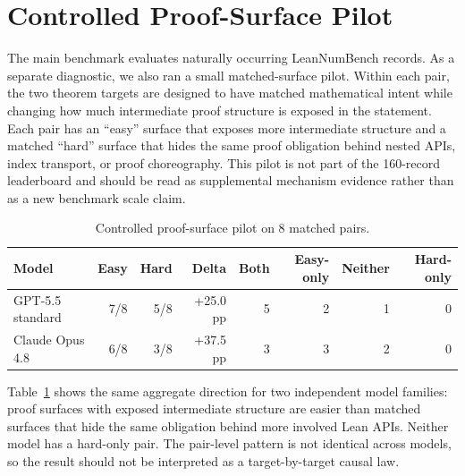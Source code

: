 \section{Controlled Proof-Surface Pilot}

The main benchmark evaluates naturally occurring LeanNumBench records. As a
separate diagnostic, we also ran a small matched-surface pilot. Within each
pair, the two theorem targets are designed to have matched mathematical intent
while changing how much intermediate proof structure is exposed in the
statement. Each pair has an ``easy'' surface that exposes more intermediate
structure and a matched ``hard'' surface that hides the same proof obligation
behind nested APIs, index transport, or proof choreography. This pilot is not
part of the 160-record leaderboard and should be read as supplemental
mechanism evidence rather than as a new benchmark scale claim.

\begin{table}[htbp]
\centering
\caption{Controlled proof-surface pilot on 8 matched pairs.}
\label{tab:supp-controlled-pair-summary}
\small
\begin{tabular}{lrrrrrrr}
\toprule
Model & Easy & Hard & Delta & Both & Easy-only & Neither & Hard-only\\
\midrule
GPT-5.5 standard & 7/8 & 5/8 & +25.0 pp & 5 & 2 & 1 & 0\\
Claude Opus 4.8 & 6/8 & 3/8 & +37.5 pp & 3 & 3 & 2 & 0\\
\bottomrule
\end{tabular}
\end{table}

Table~\ref{tab:supp-controlled-pair-summary} shows the same aggregate
direction for two independent model families: proof surfaces with exposed
intermediate structure are easier than matched surfaces that hide the same
obligation behind more involved Lean APIs. Neither model has a hard-only pair.
The pair-level pattern is not identical across models, so the result should
not be interpreted as a target-by-target causal law.

